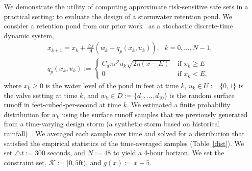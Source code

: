 \documentclass[letterpaper, 10 pt, conference]{ieeeconf}  %
\begin{document}
We demonstrate the utility of computing approximate risk-sensitive safe sets in a practical setting:
to evaluate the design of a stormwater retention pond. We consider a retention pond from our prior work~\cite{sustech} as a stochastic discrete-time dynamic system,\footnotemark
{}
\begin{equation}\begin{aligned}
& x_{k+1} = x_k + \frac{\triangle t}{A} (w_k - q_p(x_k, u_k)), \text{ }k = 0, \dots, N-1, \\
& q_p(x_k,u_k) := \begin{cases} C_d \pi r^2 u_k \sqrt{ 2\eta(x-E) } & \text{ if } x_k \geq E \\
						0 & \text{ if } x_k < E, \end{cases}
\end{aligned}\label{watersys}\end{equation}
where $x_k \geq 0$ is the water level of the pond in feet at time $k$, $u_k \in U := \{0, 1\}$ is the valve setting at time $k$,
and $w_k \in D := \{d_1, \dots, d_{10}\}$ is the random surface runoff in feet-cubed-per-second at time $k$.
We estimated a finite probability distribution for $w_k$ using the surface runoff samples that we previously generated from a time-varying design storm
(a synthetic storm based on historical rainfall)~\cite{sustech}. 
We averaged each sample over time and solved for a distribution that satisfied the empirical statistics of the time-averaged samples (Table~\ref{dist}). 
We set $\triangle t := 300$ seconds, and $N := 48$ to yield a 4-hour horizon.
We set the constraint set, $\mathcal{K} := [0, 5\text{ft})$, and $g(x) := x - 5$.
%
\end{document}
